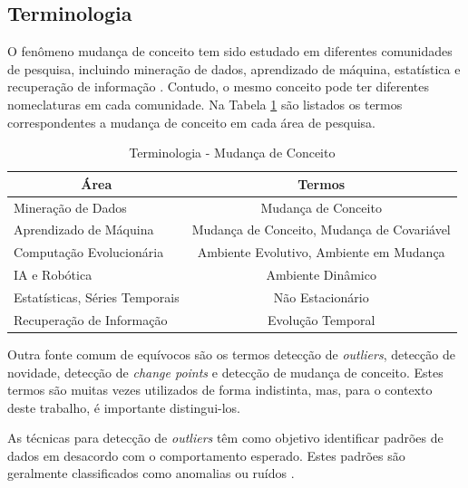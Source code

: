 \documentclass[qual, classic, a4paper]{ufbathesis}
\begin{document}
\subsection{Terminologia}

O fenômeno mudança de conceito tem sido estudado em diferentes comunidades de pesquisa, incluindo mineração de dados, 
aprendizado de máquina, estatística e recuperação de informação \cite{Zliobaite:2010}.
Contudo, o mesmo conceito pode ter diferentes nomeclaturas em cada comunidade.
Na Tabela \ref{tbl:taxonomy} são listados os termos correspondentes a mudança de conceito em cada área de pesquisa.

\begin{center} 
\begin{table}[H]
\caption{Terminologia - Mudança de Conceito \cite{Zliobaite:2010}}
\label{tbl:taxonomy}
\begin{tabularx}{\textwidth}{lc}
\hline
\multicolumn{1}{c}{\textbf{Área}} & \multicolumn{1}{c}{\textbf{Termos}}          \\
\hline
\hline
Mineração de Dados                  & Mudança de Conceito                        \\
Aprendizado de Máquina              & Mudança de Conceito, Mudança de Covariável \\
Computação Evolucionária            & Ambiente Evolutivo, Ambiente em Mudança    \\
IA e Robótica                       & Ambiente Dinâmico                          \\
Estatísticas, Séries Temporais      & Não Estacionário                           \\
Recuperação de Informação           & Evolução Temporal                          \\
\hline
\end{tabularx}
\end{table}
\end{center}

Outra fonte comum de equívocos são os termos detecção de \textit{outliers}, detecção de novidade, detecção de \textit{change points} e detecção de mudança de conceito.
Estes termos são muitas vezes utilizados de forma indistinta, mas, para o contexto deste trabalho, é importante distingui-los.

As técnicas para detecção de \textit{outliers} têm como objetivo identificar padrões de dados em desacordo com o comportamento esperado. Estes padrões são geralmente classificados como anomalias ou ruídos \cite{Chandola:2009:ADS:1541880.1541882}.
\end{document}
